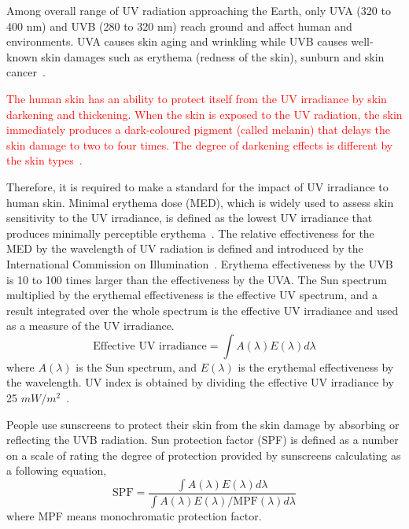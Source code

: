 \documentclass[journal]{IEEEtran}
\begin{document}
Among overall range of UV radiation approaching the Earth, only UVA (320 to 400 nm) and UVB (280 to 320 nm) reach ground and affect human and environments. UVA causes skin aging and wrinkling while UVB causes well-known skin damages such as erythema (redness of the skin), sunburn and skin cancer~\cite{Matsumura:TAP04}.

\textcolor{red}{The human skin has an ability to protect itself from the UV irradiance by skin darkening and thickening.
When the skin is exposed to the UV radiation, the skin immediately produces a dark-coloured pigment (called melanin) that delays the skin damage to two to four times. The degree of darkening effects is different by the skin types~\cite{Harrison:Method02}.}


Therefore, it is required to make a standard for the impact of UV irradiance to human skin.
Minimal erythema dose (MED), which is widely used to assess skin sensitivity to the UV irradiance, is defined as the lowest UV irradiance that produces minimally perceptible erythema~\cite{Diffey:CPPM91}.
The relative effectiveness for the MED by the wavelength of UV radiation is defined and introduced by the International Commission on Illumination~\cite{CIE}.
Erythema effectiveness by the UVB is 10 to 100 times larger than the effectiveness by the UVA.
The Sun spectrum multiplied by the erythemal effectiveness is the effective UV spectrum, and a result integrated over the whole spectrum is the effective UV irradiance and used as a measure of the UV irradiance.
%
\begin{equation}
\text{Effective~UV~irradiance} = \int A(\lambda)E(\lambda) d \lambda
 \end{equation}
%
where $A(\lambda)$ is the Sun spectrum, and $E(\lambda)$ is the erythemal effectiveness by the wavelength.
UV index is obtained by dividing the effective UV irradiance by 25 $mW/m^2$~\cite{CIE}.


People use sunscreens to protect their skin from the skin damage by absorbing or reflecting the UVB radiation.
Sun protection factor (SPF) is defined as a number on a scale of rating the degree of protection provided by sunscreens calculating as a following equation,
%
\begin{equation}
\text{SPF} = \frac{\int A(\lambda)E(\lambda) d \lambda}{\int A(\lambda)E(\lambda) / \text{MPF}(\lambda) d \lambda}
 \end{equation}
%
where MPF means monochromatic protection factor.
\end{document}
